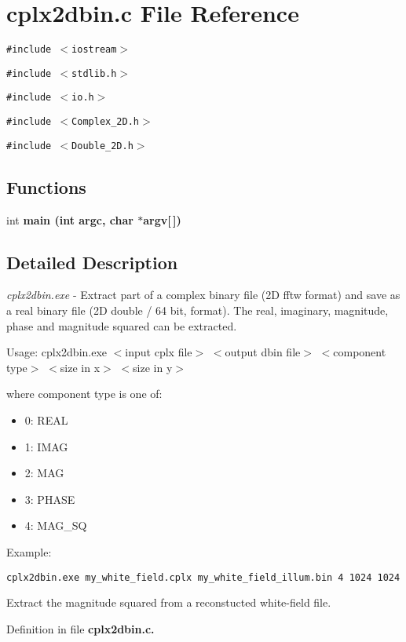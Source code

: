 \section{cplx2dbin.c File Reference}
\label{cplx2dbin_8c}
{\tt \#include $<$iostream$>$}\par
{\tt \#include $<$stdlib.h$>$}\par
{\tt \#include $<$io.h$>$}\par
{\tt \#include $<$Complex\_\-2D.h$>$}\par
{\tt \#include $<$Double\_\-2D.h$>$}\par
\subsection*{Functions}
\begin{CompactItemize}
\item 
int \bf{main} (int argc, char $\ast$argv[$\,$])\label{cplx2dbin_8c_28052c36c3b61c6c0eaa18f5d226118f}

\end{CompactItemize}


\subsection{Detailed Description}
{\em cplx2dbin.exe\/} - Extract part of a complex binary file (2D fftw format) and save as a real binary file (2D double / 64 bit, format). The real, imaginary, magnitude, phase and magnitude squared can be extracted.

\begin{Desc}
\item[Usage: cplx2dbin.exe $<$input cplx file$>$ $<$output dbin file$>$ $<$component type$>$ $<$size in x$>$ $<$size in y$>$ ]\end{Desc}
\begin{Desc}
\item[]where component type is one of:\begin{itemize}
\item 0: REAL\item 1: IMAG\item 2: MAG\item 3: PHASE\item 4: MAG\_\-SQ\end{itemize}
\end{Desc}
\begin{Desc}
\item[Example:]

\footnotesize\begin{verbatim}cplx2dbin.exe my_white_field.cplx my_white_field_illum.bin 4 1024 1024 \end{verbatim}
\normalsize
 Extract the magnitude squared from a reconstucted white-field file. \end{Desc}


Definition in file \bf{cplx2dbin.c}.
